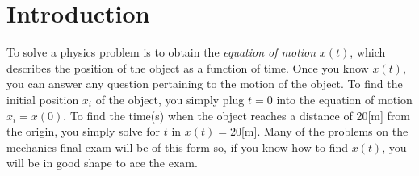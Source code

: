 \documentclass[letterpaper,9pt,journal]{IEEEtran}
\begin{document}

\section*{Introduction}


%



To solve a physics problem is to obtain the \emph{equation of motion} $x(t)$, 
which describes the position of the object as a function of time.
%
Once you know $x(t)$, you can answer any question pertaining to the motion of the object.
To find the initial position $x_i$ of the object, you simply plug $t=0$ into the equation of motion $x_i = x(0)$.
To find the time(s) when the object reaches a distance of 20[m] from the origin, you simply solve for $t$ in $x(t)=20$[m].
Many of the problems on the mechanics final exam will be of this form so,
if you know how to find $x(t)$, you will be in good shape to ace the exam.

\vspace{-3mm}
\end{document}
